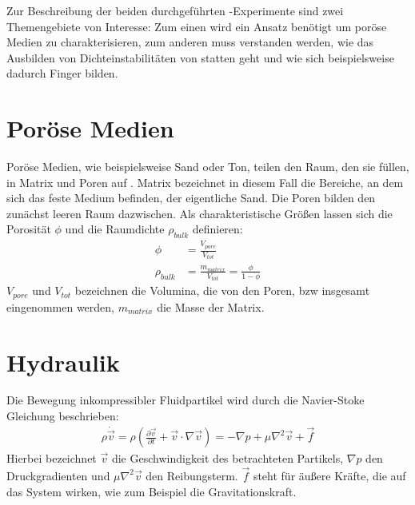 \label{cha:theo}

Zur Beschreibung der beiden durchgeführten \HSCs-Experimente sind zwei Themengebiete von Interesse: Zum einen wird ein Ansatz benötigt um poröse Medien zu charakterisieren, zum anderen muss verstanden werden, wie das Ausbilden von Dichteinstabilitäten von statten geht und wie sich beispielsweise dadurch Finger bilden.

\section{Poröse Medien}
\label{sec:por}
Poröse Medien, wie beispielsweise Sand oder Ton, teilen den Raum, den sie füllen, in Matrix und Poren auf \citep{roth2005}.  Matrix bezeichnet in diesem Fall die Bereiche, an dem sich das feste Medium befinden, der eigentliche Sand. Die Poren bilden den zunächst leeren Raum dazwischen.
Als charakteristische Größen lassen sich die Porosität $\phi$ und die Raumdichte $\rho_{bulk}$ definieren:
\begin{align}
 \phi &= \frac{V_{pore}}{V_{tot}} \\
 \rho_{bulk} &= \frac{m_{matrix}}{V_{tot}} = \frac{\phi}{1-\phi}
\end{align}
$V_{pore}$ und $V_{tot}$ bezeichnen die Volumina, die von den Poren, bzw insgesamt eingenommen werden, $m_{matrix}$ die Masse der Matrix. 

\section{Hydraulik}
\label{sec:hyd}
Die Bewegung inkompressibler Fluidpartikel wird durch die Navier-Stoke Gleichung beschrieben:
\begin{eqnarray}
 \rho \dot{\vec{v}} = \rho \left( \frac{\partial \vec{v}}{\partial t} + \vec{v} \cdot \nabla \vec{v} \right) = - \nabla p + \mu \nabla^2 \vec{v} + \vec{f}
\end{eqnarray}
Hierbei bezeichnet $\vec{v}$ die Geschwindigkeit des betrachteten Partikels, $\nabla p$ den Druckgradienten und $\mu \nabla^2 \vec{v}$ den Reibungsterm. $\vec{f}$ steht für äußere Kräfte, die auf das System wirken, wie zum Beispiel die Gravitationskraft. \citep{roth2005}

